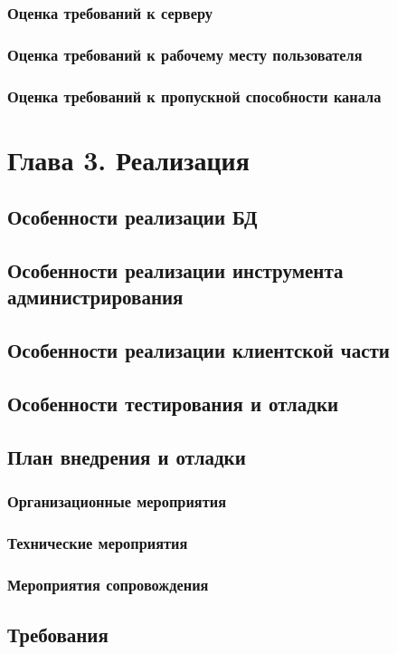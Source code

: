 \documentclass[utf8,usehyperref,12pt]{G7-32}
\begin{document}
\subsection{Оценка требований к серверу}
\subsection{Оценка требований к рабочему месту пользователя}
\subsection{Оценка требований к пропускной способности канала}

\chapter{Глава 3. Реализация}
\section{Особенности реализации БД}
\section{Особенности реализации инструмента администрирования}
\section{Особенности реализации клиентской части}
\section{Особенности тестирования и отладки}
\section{План внедрения и отладки}
\subsection{Организационные мероприятия}
\subsection{Технические мероприятия}
\subsection{Мероприятия сопровождения}
\section{Требования}
\end{document}
